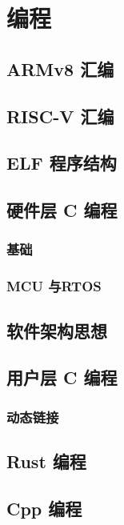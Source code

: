 \chapter{编程}

\section{ARMv8 汇编}

\section{RISC-V 汇编}

\section{ELF 程序结构}

\section{硬件层 C 编程}
\subsection{基础}
\subsection{MCU 与RTOS}

\section{软件架构思想}

\section{用户层 C 编程}
\subsection{动态链接}

\section{Rust 编程}

\section{Cpp 编程}
